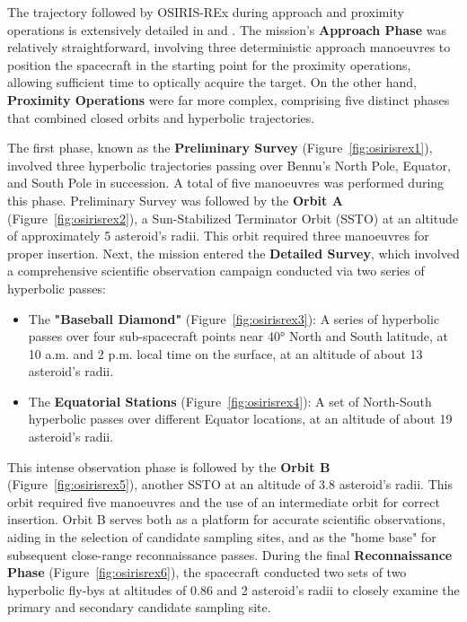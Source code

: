 \documentclass{Configuration_gigi/PoliMi3i_thesis}
\begin{document}
The trajectory followed by OSIRIS-REx during approach and proximity operations is extensively detailed in \cite{osirisrex} and \cite{osirisrexFD}. The mission's \textbf{Approach Phase} was relatively straightforward, involving three deterministic approach manoeuvres to position the spacecraft in the starting point for the proximity operations, allowing sufficient time to optically acquire the target. On the other hand, \textbf{Proximity Operations} were far more complex, comprising five distinct phases that combined closed orbits and hyperbolic trajectories. 

The first phase, known as the \textbf{Preliminary Survey} (Figure~\ref{fig:osirisrex1}), involved three hyperbolic trajectories passing over Bennu's North Pole, Equator, and South Pole in succession. A total of five manoeuvres was performed during this phase. Preliminary Survey was followed by the \textbf{Orbit A} (Figure~\ref{fig:osirisrex2}), a Sun-Stabilized Terminator Orbit (SSTO) at an altitude of approximately 5 asteroid's radii. This orbit required three manoeuvres for proper insertion. Next, the mission entered the \textbf{Detailed Survey}, which involved a comprehensive scientific observation campaign conducted via two series of hyperbolic passes:

\begin{itemize}
    \item The \textbf{"Baseball Diamond"} (Figure~\ref{fig:osirisrex3}): A series of hyperbolic passes over four sub-spacecraft points near 40° North and South latitude, at 10 a.m. and 2 p.m. local time on the surface, at an altitude of about 13 asteroid's radii.
    \item The \textbf{Equatorial Stations} (Figure~\ref{fig:osirisrex4}): A set of North-South hyperbolic passes over different Equator locations, at an altitude of about 19 asteroid's radii.
\end{itemize}

This intense observation phase is followed by the \textbf{Orbit B} (Figure~\ref{fig:osirisrex5}), another SSTO at an altitude of 3.8 asteroid's radii. This orbit required five manoeuvres and the use of an intermediate orbit for correct insertion. Orbit B serves both as a platform for accurate scientific observations, aiding in the selection of candidate sampling sites, and as the "home base" for subsequent close-range reconnaissance passes. During the final \textbf{Reconnaissance Phase} (Figure~\ref{fig:osirisrex6}), the spacecraft conducted two sets of two hyperbolic fly-bys at altitudes of 0.86 and 2 asteroid's radii to closely examine the primary and secondary candidate sampling site. 
\end{document}
